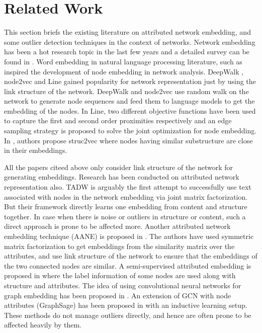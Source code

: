 \documentclass[letterpaper]{article} %
\begin{document}

\section{Related Work}\label{sec:rw}
This section briefs the existing literature on attributed network embedding, and some outlier detection techniques in the context of networks. Network embedding has been a hot research topic in the last few years and a detailed survey can be found in \cite{hamilton2017representation}. 
Word embedding in natural language processing literature, such as \cite{mikolov2013efficient} inspired the development of node embedding in network analysis.
DeepWalk \cite{perozzi2014deepwalk}, node2vec \cite{grover2016node2vec} and Line \cite{tang2015line} gained popularity for network representation just by using the link structure of the network. DeepWalk and node2vec use random walk on the network to generate node sequences and feed them to language models to get the embedding of the nodes. In Line, two different objective functions have been used to capture the first and second order proximities respectively and an edge sampling strategy is proposed to solve the joint optimization for node embedding. In \cite{ribeiro2017struc2vec}, authors propose struc2vec where nodes having similar substructure are close in their embeddings.

All the papers citeed above only consider link structure of the network for generating embeddings. Research has been conducted on attributed network representation also. TADW \cite{yang2015network} is arguably the first attempt to successfully use text associated with nodes in the network embedding via joint matrix factorization. But their framework directly learns one embedding from content and structure together. In case when there is noise or outliers in structure or content, such a direct approach is prone to be affected more. Another attributed network embedding technique (AANE) is proposed in \cite{huang2017accelerated}. The authors have used symmetric matrix factorization to get embeddings from the similarity matrix over the attributes, and use link structure of the network to ensure that the embeddings of the two connected nodes are similar. A semi-supervised attributed embedding is proposed in \cite{huang2017label} where the label information of some nodes are used along with structure and attributes. The idea of using convolutional neural networks for graph embedding has been proposed in \cite{niepert2016learning,kipf2016semi}. An extension of GCN with node attributes (GraphSage) has been proposed in \cite{hamilton2017inductive} with an inductive learning setup. These methods do not manage outliers directly, and hence are often prone to be affected heavily by them.
\end{document}
